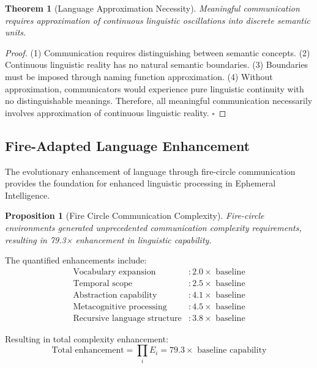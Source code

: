 \documentclass[12pt,a4paper]{article}
\newtheorem{theorem}{Theorem}
\newtheorem{proposition}{Proposition}
\begin{document}
\begin{theorem}[Language Approximation Necessity]
Meaningful communication requires approximation of continuous linguistic oscillations into discrete semantic units.
\end{theorem}

\begin{proof}
(1) Communication requires distinguishing between semantic concepts. (2) Continuous linguistic reality has no natural semantic boundaries. (3) Boundaries must be imposed through naming function approximation. (4) Without approximation, communicators would experience pure linguistic continuity with no distinguishable meanings. Therefore, all meaningful communication necessarily involves approximation of continuous linguistic reality. $\square$
\end{proof}

\subsection{Fire-Adapted Language Enhancement}

The evolutionary enhancement of language through fire-circle communication provides the foundation for enhanced linguistic processing in Ephemeral Intelligence.

\begin{proposition}[Fire Circle Communication Complexity]
Fire-circle environments generated unprecedented communication complexity requirements, resulting in 79.3× enhancement in linguistic capability.
\end{proposition}

The quantified enhancements include:
\begin{align}
\text{Vocabulary expansion} &: 2.0\times \text{ baseline} \\
\text{Temporal scope} &: 2.5\times \text{ baseline} \\
\text{Abstraction capability} &: 4.1\times \text{ baseline} \\
\text{Metacognitive processing} &: 4.5\times \text{ baseline} \\
\text{Recursive language structure} &: 3.8\times \text{ baseline}
\end{align}

Resulting in total complexity enhancement:
\begin{equation}
\text{Total enhancement} = \prod_{i} E_i = 79.3\times \text{ baseline capability}
\end{equation}
\end{document}
